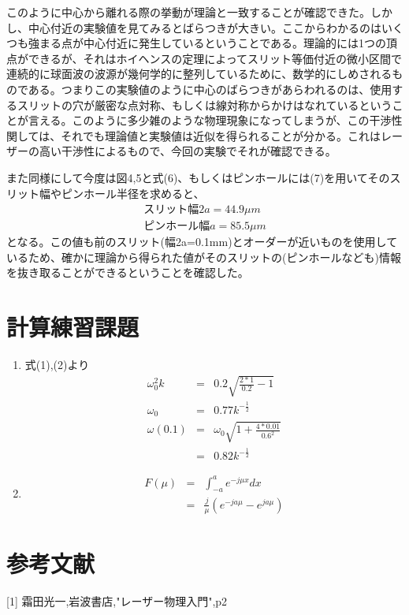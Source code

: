 \documentclass[11pt,a4j]{jsarticle}
\begin{document}
このように中心から離れる際の挙動が理論と一致することが確認できた。しかし、中心付近の実験値を見てみるとばらつきが大きい。ここからわかるのはいくつも強まる点が中心付近に発生しているということである。理論的には1つの頂点ができるが、それはホイヘンスの定理によってスリット等価付近の微小区間で連続的に球面波の波源が幾何学的に整列しているために、数学的にしめされるものである。つまりこの実験値のように中心のばらつきがあらわれるのは、使用するスリットの穴が厳密な点対称、もしくは線対称からかけはなれているということが言える。このように多少雑のような物理現象になってしまうが、この干渉性関しては、それでも理論値と実験値は近似を得られることが分かる。これはレーザーの高い干渉性によるもので、今回の実験でそれが確認できる。
  
  また同様にして今度は図4,5と式(6)、もしくはピンホールには(7)を用いてそのスリット幅やピンホール半径を求めると、
  \begin{eqnarray}
   スリット幅 2a = 44.9 \mu m \nonumber \\
   ピンホール幅 a = 85.5 \mu m \nonumber
  \end{eqnarray}
  となる。この値も前のスリット(幅2a=0.1mm)とオーダーが近いものを使用しているため、確かに理論から得られた値がそのスリットの(ピンホールなども)情報を抜き取ることができるということを確認した。
  
  \clearpage
  
  
 \section{計算練習課題}
 \begin{enumerate}
  \item 式(1),(2)より
  \begin{eqnarray}
   \omega_0^2 k &=& 0.2 \sqrt{\frac{2 * 1}{0.2} - 1} \nonumber \\
   \omega_0     &=& 0.77 k^{-\frac{1}{2}} \nonumber \\
   \omega(0.1)  &=& \omega_0 \sqrt{1 + \frac{4 * 0.01}{0.6^2}} \nonumber \\
                &=& 0.82 k^{-\frac{1}{2}} \nonumber
  \end{eqnarray}
  
  \item 
  \begin{eqnarray}
   F(\mu) &=& \int_{-a}^a e^{-j\mu x} dx \nonumber \\
          &=& \frac{j}{\mu}(e^{-ja\mu} - e^{ja\mu}) \nonumber
  \end{eqnarray}


 \end{enumerate}


  
  
 \section{参考文献}
  [1] 霜田光一,岩波書店,"レーザー物理入門",p2
  
  
\end{document}
